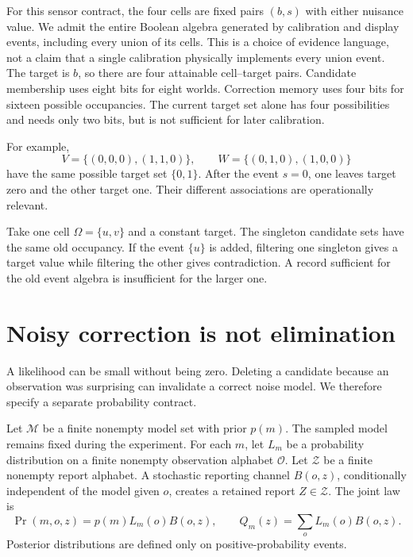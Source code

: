 For this sensor contract, the four cells are fixed pairs $(b,s)$ with either nuisance value. We admit the entire Boolean algebra generated by calibration and display events, including every union of its cells. This is a choice of evidence language, not a claim that a single calibration physically implements every union event. The target is $b$, so there are four attainable cell--target pairs. Candidate membership uses eight bits for eight worlds. Correction memory uses four bits for sixteen possible occupancies. The current target set alone has four possibilities and needs only two bits, but is not sufficient for later calibration.

For example,
\[
V=\{(0,0,0),(1,1,0)\},\qquad W=\{(0,1,0),(1,0,0)\}
\]
have the same possible target set $\{0,1\}$. After the event $s=0$, one leaves target zero and the other target one. Their different associations are operationally relevant.

\begin{counterexample}\label{ce:split}
Take one cell $\Omega=\{u,v\}$ and a constant target. The singleton candidate sets have the same old occupancy. If the event $\{u\}$ is added, filtering one singleton gives a target value while filtering the other gives contradiction. A record sufficient for the old event algebra is insufficient for the larger one.
\end{counterexample}

\section{Noisy correction is not elimination}
A likelihood can be small without being zero. Deleting a candidate because an observation was surprising can invalidate a correct noise model. We therefore specify a separate probability contract.

Let $\mathcal M$ be a finite nonempty model set with prior $p(m)$. The sampled model remains fixed during the experiment. For each $m$, let $L_m$ be a probability distribution on a finite nonempty observation alphabet $\mathcal O$. Let $\mathcal Z$ be a finite nonempty report alphabet. A stochastic reporting channel $B(o,z)$, conditionally independent of the model given $o$, creates a retained report $Z\in\mathcal Z$. The joint law is
\[
\Pr(m,o,z)=p(m)L_m(o)B(o,z),\qquad Q_m(z)=\sum_oL_m(o)B(o,z).
\]
Posterior distributions are defined only on positive-probability events.

